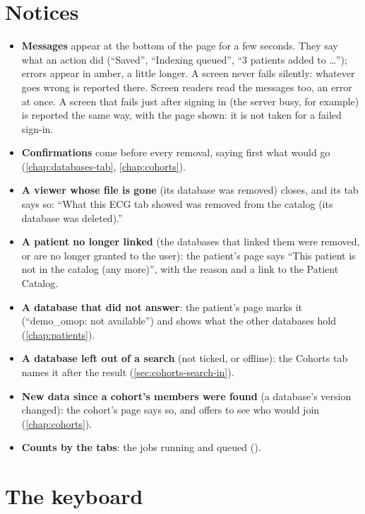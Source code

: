 \section{Notices}
\label{sec:page-notices}

\begin{itemize}
\item \textbf{Messages} appear at the bottom of the page for a few seconds. They say what an
  action did (``Saved'', ``Indexing queued'', ``3 patients added to \dots''); errors appear in
  amber, a little longer. A screen never fails silently: whatever goes wrong is reported there.
  Screen readers read the messages too, an error at once. A screen that fails just after
  signing in (the server busy, for example) is reported the same way, with the page shown: it
  is not taken for a failed sign-in.
\item \textbf{Confirmations} come before every removal, saying first what would go
  (\cref{chap:databases-tab}, \cref{chap:cohorts}).
\item \textbf{A viewer whose file is gone} (its database was removed) closes, and its tab says
  so: ``What this ECG tab showed was removed from the catalog (its database was deleted).''
\item \textbf{A patient no longer linked} (the databases that linked them were removed, or are
  no longer granted to the user): the patient's page says ``This patient is not in the catalog
  (any more)'', with the reason and a link to the Patient Catalog.
\item \textbf{A database that did not answer}: the patient's page marks it
  (``demo\_omop: not available'') and shows what the other databases hold
  (\cref{chap:patients}).
\item \textbf{A database left out of a search} (not ticked, or offline): the Cohorts tab names
  it after the result (\cref{sec:cohorts-search-in}).
\item \textbf{New data since a cohort's members were found} (a database's version changed): the
  cohort's page says so, and offers to see who would join (\cref{chap:cohorts}).
\item \textbf{Counts by the tabs}: the jobs running and queued ().
\end{itemize}

\section{The keyboard}
\label{sec:page-keyboard}

